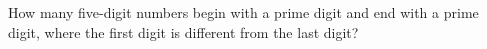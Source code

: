 How many five-digit numbers begin with a prime digit and end with a prime digit, where the first digit is different from the last digit?
